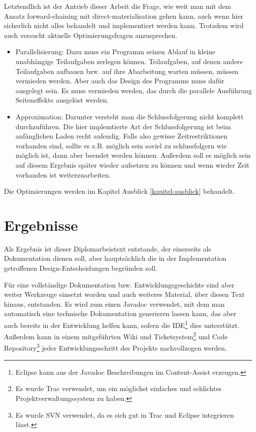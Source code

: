 Letztendlich ist der Antrieb dieser Arbeit die Frage, wie weit man mit dem Ansatz forward-chaining mit direct-materialisation gehen kann, auch wenn hier sicherlich nicht alles behandelt und implementiert werden kann. Trotzdem wird auch versucht aktuelle Optimierungsfragen anzusprechen.

\begin{itemize}
  \item Parallelisierung: Dazu muss ein Programm seinen Ablauf in kleine unabhängige Teilaufgaben zerlegen können. Teilaufgaben, auf denen andere Teilaufgaben aufbauen bzw. auf ihre Abarbeitung warten müssen, müssen vermieden werden. Aber auch das Design des Programms muss dafür ausgelegt sein. Es muss vermieden werden, das durch die parallele Ausführung Seiteneffekte ausgelöst werden.
  \item Approximation: Darunter versteht man die Schlussfolgerung nicht komplett durchzuführen. Die hier implemtierte Art der Schlussfolgerung ist beim anfänglichen Laden recht aufendig. Falls also gewisse Zeitrestriktionen vorhanden sind, sollte es z.B. möglich sein soviel zu schlussfolgern wie möglich ist, dann aber beendet werden können. Außerdem soll es möglich sein auf diesem Ergebnis später wieder aufsetzen zu können und wenn wieder Zeit vorhanden ist weiterzuarbeiten.
\end{itemize}

Die Optimierungen werden im Kapitel Ausblick \ref{kapitel-ausblick} behandelt.

\section{Ergebnisse}
Als Ergebnis ist dieser Diplomarbeistext entstande, der einerseits als Dokumentation dienen soll, aber hauptsächlich die in der Implementation getroffenen Design-Entscheidungen begründen soll.

Für eine vollständige Dokumentation bzw. Entwicklungsgeschichte sind aber weiter Werkzeuge einsetzt worden und auch weiteres Material, über diesen Text hinaus, entstanden. Es wird zum einen Javadoc verwendet, mit dem man automatisch eine technische Dokumentation generieren lassen kann, das aber auch bereits in der Entwicklung helfen kann, sofern die IDE\footnote{Eclipse kann aus der Javadoc Beschreibungen im Content-Assist erzeugen.} dies unterstützt. Außerdem kann in einem mitgeführten Wiki und Ticketsystem\footnote{Es wurde Trac verwendet, um ein möglichst einfaches und schlichtes Projektverwaltungssystem zu haben.} und Code Repository\footnote{Es wurde SVN verwendet, da es sich gut in Trac und Eclipse integrieren lässt.} jeder Entwicklungsschritt des Projekts nachvollzogen werden.


